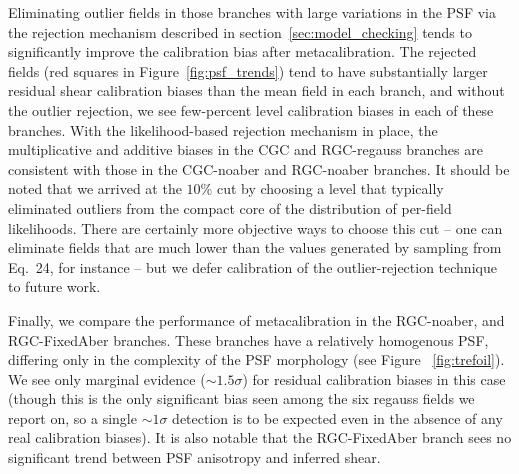 \documentclass[iop]{emulateapj}
\newcommand\rmcomment[1]{\textcolor{red}{(RM: #1)}}
\begin{document}
Eliminating outlier fields in those branches with large variations in
the PSF via the rejection mechanism described in
section~\ref{sec:model_checking} tends to significantly improve the
calibration bias after metacalibration. The rejected fields (red
squares in Figure~\ref{fig:psf_trends}) tend to have substantially
larger residual shear calibration biases than the mean field in each
branch, and without the outlier rejection, we see few-percent level
calibration biases in each of these branches. With the likelihood-based 
rejection mechanism in place, the multiplicative and additive biases
in the CGC and RGC-regauss branches are consistent with those in the
CGC-noaber and RGC-noaber branches. It should be noted that we arrived
at the $10\%$ cut by choosing a level that typically eliminated
outliers from the compact core of the distribution of per-field
likelihoods. There are certainly more objective ways to choose this
cut -- one can eliminate fields that are much lower than the values
generated by sampling from Eq.~24, for instance
-- but we defer calibration of the outlier-rejection technique to future work.


Finally, we compare the performance of metacalibration in the
RGC-noaber, and RGC-FixedAber branches. These branches have a
relatively homogenous PSF, differing only in the complexity of the PSF
morphology (see Figure ~\ref{fig:trefoil}). We see only marginal
evidence ($\sim1.5\sigma$) for residual calibration biases in this
case (though this is the only significant bias seen among the six
regauss fields we report on, so a single $\sim1\sigma$ detection
is to be expected even in the absence of any real calibration
biases). It is also notable that the RGC-FixedAber branch sees no
significant trend between PSF anisotropy and inferred shear.
\end{document}
